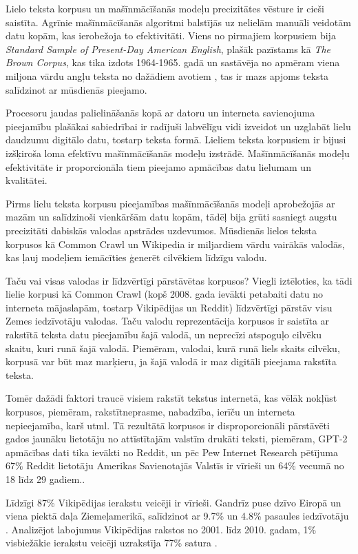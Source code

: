 
Lielo teksta korpusu un mašīnmācīšanās modeļu precizitātes vēsture ir cieši saistīta. Agrīnie mašīnmācīšanās algoritmi balstījās uz nelielām manuāli veidotām datu kopām, kas ierobežoja to efektivitāti. Viens no pirmajiem korpusiem bija \textit{Standard Sample of Present-Day American English}, plašāk pazīstams kā \textit{The Brown Corpus}, kas tika izdots 1964-1965. gadā un sastāvēja no apmēram viena miljona vārdu angļu teksta no dažādiem avotiem \cite{brown-corpus}, tas ir mazs apjoms teksta salīdzinot ar mūsdienās pieejamo.

Procesoru jaudas palielināšanās kopā ar datoru un interneta savienojuma pieejamību plašākai sabiedrībai ir radījuši labvēlīgu vidi izveidot un uzglabāt lielu daudzumu digitālo datu, tostarp teksta formā. Lieliem teksta korpusiem ir bijusi izšķiroša loma efektīvu mašīnmācīšanās modeļu izstrādē. Mašīnmācīšanās modeļu efektivitāte ir proporcionāla tiem pieejamo apmācības datu lielumam un kvalitātei. %

Pirms lielu teksta korpusu pieejamības mašīnmācīšanās modeļi aprobežojās ar mazām un salīdzinoši vienkāršām datu kopām, tādēļ bija grūti sasniegt augstu precizitāti dabiskās valodas apstrādes uzdevumos. Mūsdienās lielos teksta korpusos kā Common Crawl un Wikipedia ir miljardiem vārdu vairākās valodās, kas ļauj modeļiem iemācīties ģenerēt cilvēkiem līdzīgu valodu.

Taču vai visas valodas ir līdzvērtīgi pārstāvētas korpusos? Viegli iztēloties, ka tādi lielie korpusi kā Common Crawl (kopš 2008. gada ievākti petabaiti datu no interneta mājaslapām, tostarp Vikipēdijas un Reddit) līdzvērtīgi pārstāv visu Zemes iedzīvotāju valodas. Taču valodu reprezentācija korpusos ir saistīta ar rakstītā teksta datu pieejamību šajā valodā, un neprecīzi atspoguļo cilvēku skaitu, kuri runā šajā valodā. Piemēram, valodai, kurā runā liels skaits cilvēku, korpusā var būt maz marķieru, ja šajā valodā ir maz digitāli pieejama rakstīta teksta.

Tomēr dažādi faktori traucē visiem rakstīt tekstus internetā, kas vēlāk nokļūst korpusos, piemēram, rakstītneprasme, nabadzība, ierīču un interneta nepieejamība, karš utml. Tā rezultātā korpusos ir disproporcionāli pārstāvēti gados jaunāku lietotāju no attīstītajām valstīm drukāti teksti, piemēram, GPT-2 apmācības dati tika ievākti no Reddit, un pēc Pew Internet Research pētījuma 67\% Reddit lietotāju Amerikas Savienotajās Valstīs ir vīrieši un 64\% vecumā no 18 līdz 29 gadiem.\cite{bender2021}.

Līdzīgi 87\% Vikipēdijas ierakstu veicēji ir vīrieši. Gandrīz puse dzīvo Eiropā un viena piektā daļa Ziemeļamerikā, salīdzinot ar 9.7\% un 4.8\% pasaules iedzīvotāju \cite{wikimedia2020}. Analizējot labojumus Vikipēdijas rakstos no 2001. līdz 2010. gadam, 1\% visbiežākie ierakstu veicēji uzrakstīja 77\% satura \cite{1percent}.

